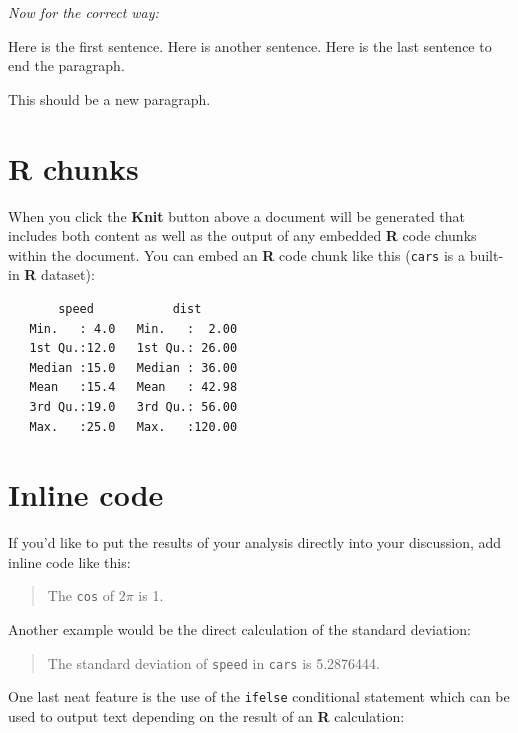 \documentclass[12pt,twoside]{reedthesis}
\begin{document}
  \emph{Now for the correct way:}
  
  Here is the first sentence. Here is another sentence. Here is the last
  sentence to end the paragraph.
  
  This should be a new paragraph.
  
  \section{R chunks}\label{r-chunks}
  
  When you click the \textbf{Knit} button above a document will be
  generated that includes both content as well as the output of any
  embedded \textbf{R} code chunks within the document. You can embed an
  \textbf{R} code chunk like this (\texttt{cars} is a built-in \textbf{R}
  dataset):
  
  \begin{Shaded}
  \begin{Highlighting}[]
  \end{Highlighting}
  \end{Shaded}
  
  \begin{verbatim}
       speed           dist       
   Min.   : 4.0   Min.   :  2.00  
   1st Qu.:12.0   1st Qu.: 26.00  
   Median :15.0   Median : 36.00  
   Mean   :15.4   Mean   : 42.98  
   3rd Qu.:19.0   3rd Qu.: 56.00  
   Max.   :25.0   Max.   :120.00  
  \end{verbatim}
  
  \section{Inline code}\label{inline-code}
  
  If you'd like to put the results of your analysis directly into your
  discussion, add inline code like this:
  
  \begin{quote}
  The \texttt{cos} of \(2 \pi\) is 1.
  \end{quote}
  
  Another example would be the direct calculation of the standard
  deviation:
  
  \begin{quote}
  The standard deviation of \texttt{speed} in \texttt{cars} is 5.2876444.
  \end{quote}
  
  One last neat feature is the use of the \texttt{ifelse} conditional
  statement which can be used to output text depending on the result of an
  \textbf{R} calculation:
  
\end{document}
